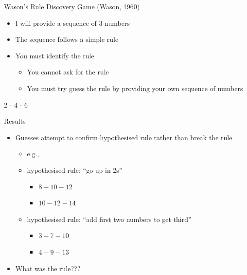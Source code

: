 \documentclass[
  ignorenonframetext,
]{beamer}
\providecommand{\tightlist}{%
  \setlength{\itemsep}{0pt}\setlength{\parskip}{0pt}}\usepackage{longtable,booktabs,array}
\begin{document}
\begin{frame}{Wason's Rule Discovery Game}
\protect\hypertarget{wasons-rule-discovery-game}{}
(Wason, 1960)

\begin{itemize}
\item
  I will provide a sequence of 3 numbers
\item
  The sequence follows a simple rule
\item
  You must identify the rule

  \begin{itemize}
  \tightlist
  \item
    You cannot ask for the rule
  \item
    You must try guess the rule by providing your own sequence of
    numbers
  \end{itemize}
\end{itemize}

2 - 4 - 6
\end{frame}

\begin{frame}{Results}
\protect\hypertarget{results}{}
\begin{itemize}
\tightlist
\item
  Guesses attempt to confirm hypothesised rule rather than break the
  rule

  \begin{itemize}
  \tightlist
  \item
    e.g.,
  \item
    hypothesised rule: ``go up in 2s''

    \begin{itemize}
    \tightlist
    \item
      \(8 - 10 - 12\)
    \item
      \(10 - 12 - 14\)
    \end{itemize}
  \item
    hypothesised rule: ``add first two numbers to get third''

    \begin{itemize}
    \tightlist
    \item
      \(3 - 7 - 10\)
    \item
      \(4 - 9 - 13\)
    \end{itemize}
  \end{itemize}
\item
  What was the rule???
\end{itemize}
\end{frame}
\end{document}
